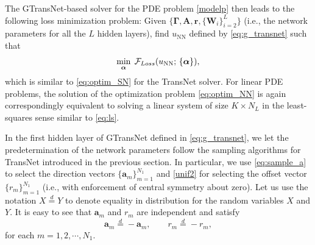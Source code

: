 \documentclass{article}
\newcommand{\ba}{\mathbf{a}}
\newcommand{\br}{\mathbf{r}}
\newcommand{\bA}{\mathbf{A}}
\newcommand{\bW}{\mathbf{W}}
\newcommand{\valpha}{{\boldsymbol{\alpha}}}
\begin{document}
The GTransNet-based solver for the PDE problem \eqref{modelp} then leads to the following loss minimization problem: Given $\{{\mathbf\Gamma}, \bA, \br, \{\bW_i\}_{i=2}^{L}\}$ (i.e., the network parameters for all the $L$ hidden layers), find $u_{\mathrm{NN}}$ defined by \eqref{eq:g_transnet} such that
\begin{equation}\label{eq:optim_NN} \min_{\valpha}\; {\cal F}_{Loss}(u_{\mathrm{NN}};\,\{\valpha\}), \end{equation}
which is similar to \eqref{eq:optim_SN} for the TransNet solver.
For linear PDE problems, the solution of the optimization problem \eqref{eq:optim_NN} is again correspondingly equivalent to solving a linear system of size $K \times N_L$ in the least-squares sense similar to \eqref{eq:ls}.

In the first hidden layer of GTransNet defined in \eqref{eq:g_transnet}, we let the predetermination of the network parameters follow the sampling algorithms for TransNet introduced in the previous section. In particular, we use \eqref{eq:sample_a} to select the direction vectors $\{\ba_m\}_{m=1}^{N_1}$ and \eqref{unif2} for selecting the offset vector $\{r_m\}_{m=1}^{N_1}$ (i.e., with enforcement of central symmetry about zero).
Let us use the notation $X \stackrel{d}{=} Y$ to denote equality in distribution for the random variables $X$ and $Y$. It is easy to see that $\ba_m$ and $r_m$ are independent and satisfy
\begin{equation}\label{eq:CS}
\ba_m \stackrel{d}{=} -\ba_m, \qquad r_m \stackrel{d}{=} -r_m,
\end{equation}
for each $m = 1, 2, \cdots, N_1$.
\end{document}
